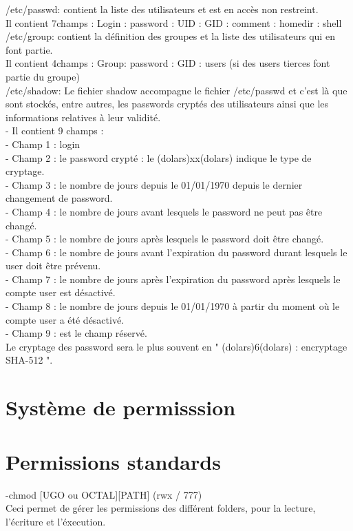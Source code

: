 \documentclass[11pt,a4peper]{article}
\begin{document}
/etc/passwd: contient la liste des utilisateurs et est en accès non restreint.\\
Il contient 7champs : Login : password : UID : GID : comment : homedir : shell
/etc/group: contient la définition des groupes et la liste des utilisateurs qui en font partie.\\
Il contient 4champs : Group: password : GID : users (si des users tierces font partie du groupe)\\
/etc/shadow: Le fichier shadow accompagne le fichier /etc/passwd et c’est là que sont stockés, entre autres, les passwords cryptés des utilisateurs ainsi que les informations relatives à leur validité.\\
- Il contient 9 champs : \\
- Champ 1 : login \\
- Champ 2 : le password crypté : le (dolars)xx(dolars) indique le type de cryptage.\\
- Champ 3 : le nombre de jours depuis le 01/01/1970 depuis le dernier changement de password. \\
- Champ 4 : le nombre de jours avant lesquels le password ne peut pas être changé. \\
- Champ 5 : le nombre de jours après lesquels le password doit être changé. \\
- Champ 6 : le nombre de jours avant l’expiration du password durant lesquels le user doit être prévenu. \\
- Champ 7 : le nombre de jours après l’expiration du password après lesquels le compte user est désactivé. \\
- Champ 8 : le nombre de jours depuis le 01/01/1970 à partir du moment où le compte user a été désactivé. \\
- Champ 9 : est le champ réservé. \\
Le cryptage des password sera le plus souvent en " (dolars)6(dolars) : encryptage SHA-512 ".\\

\section{Système de permisssion}
\section{Permissions standards}

-chmod [UGO ou OCTAL][PATH]  (rwx / 777)\\
Ceci permet de gérer les permissions des différent folders, pour la lecture, l'écriture et l'éxecution.
\end{document}
